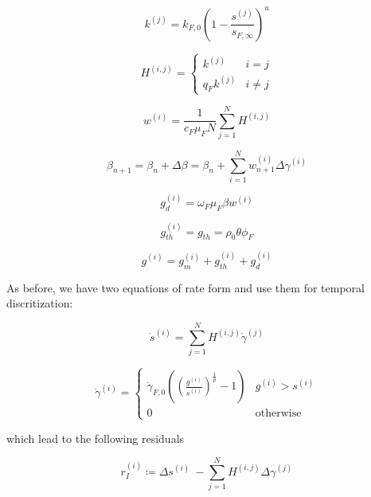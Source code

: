 \documentclass{article}
\begin{document}
\begin{equation}
    k^{(j)} = k_{F,0} \left( 1 - \frac{s^{(j)}}{s_{F,\infty}} \right)^u
\end{equation}

\begin{equation}
    H^{(i,j)} =
    \begin{cases}
        k^{(j)}       &   i = j\\
        q_F k^{(j)}   &   i \neq j
    \end{cases}
\end{equation}

\begin{equation}
    w^{(i)} = \frac{1}{c_F \mu_F N} \sum_{j=1}^N H^{(i,j)}
\end{equation}

\begin{equation}
    \beta_{n+1} = \beta_n + \Delta \beta = \beta_n + \sum_{i=1}^N w_{n+1}^{(i)} \Delta \gamma^{(i)}
\end{equation}

\begin{equation}
    g_d^{(i)} = \omega_F \mu_F \beta w^{(i)}
\end{equation}

\begin{equation}
    g_{th}^{(i)} = g_{th} = \rho_0 \theta \phi_F
\end{equation}

\begin{equation}
    g^{(i)} = g_{m}^{(i)} + g_{th}^{(i)} + g_{d}^{(i)}
\end{equation}


As before, we have two equations of rate form and use them for temporal discritization:

\begin{equation}
    \dot{s}^{(i)} = \sum_{j=1}^N H^{(i,j)} \dot{\gamma}^{(j)}
\end{equation}

\begin{equation}
    \dot{\gamma}^{(i)} =
    \begin{cases}
        \dot{\gamma}_{F,0} \left(\left(\frac{g^{(i)}}{s^{(i)}}\right)^{\frac{1}{p}} - 1 \right) & g^{(i)} > s^{(i)}\\
        0 & \text{otherwise}
    \end{cases}
\end{equation}

which lead to the following residuals

\begin{equation}
    r_I^{(i)} \coloneqq \Delta s^{(i)}\ - \sum_{j=1}^N H^{(i,j)} \Delta \gamma^{(j)}
\end{equation}
\end{document}
